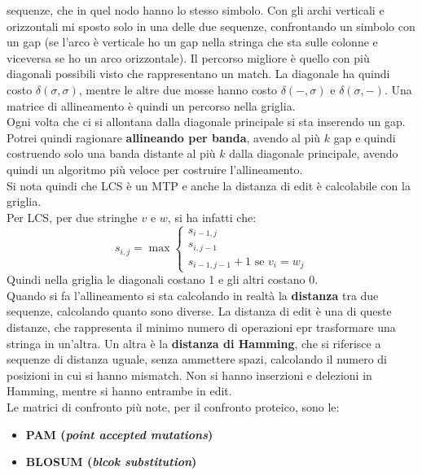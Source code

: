 \documentclass[a4paper,12pt, oneside]{book}
\begin{document}
sequenze, che in quel nodo hanno lo stesso simbolo. Con gli archi verticali e
orizzontali mi sposto solo in una delle due sequenze, confrontando un simbolo
con un gap (se l'arco è verticale ho un gap nella stringa che sta sulle colonne
e viceversa se ho un arco orizzontale). Il percorso migliore è quello con più
diagonali possibili visto che rappresentano un match. La diagonale ha quindi
costo $\delta(\sigma,\sigma)$, mentre le altre due mosse hanno costo
$\delta(-,\sigma)$ e $\delta(\sigma,-)$. Una matrice di
allineamento è quindi un percorso nella griglia.\\
Ogni volta che ci si allontana dalla diagonale principale si sta inserendo un
gap. Potrei quindi ragionare \textbf{allineando per banda}, avendo al più $k$
gap e quindi costruendo solo una banda distante al più $k$ dalla diagonale
principale, avendo quindi un algoritmo più veloce per costruire
l'allineamento. \\
Si nota quindi che LCS è un MTP e anche la distanza di edit è calcolabile con la
griglia. \\
Per LCS, per due stringhe $v$ e $w$, si ha infatti che:
\[s_{i,j}=\max
  \begin{cases}
    s_{i-1,j}\\
    s_{i,j-1}\\
    s_{i-1,j-1}+1\mbox{ se } v_i=w_j
  \end{cases}
\]
Quindi nella griglia le diagonali costano 1 e gli altri costano 0. \\
Quando si fa l'allineamento si sta calcolando in realtà la \textbf{distanza} tra
due sequenze, calcolando quanto sono diverse. La distanza di edit è una di
queste distanze, che rappresenta il minimo numero di operazioni epr trasformare
una stringa in un'altra. Un altra è la \textbf{distanza di Hamming}, che si
riferisce a sequenze di distanza uguale, senza ammettere spazi, calcolando il
numero di posizioni in cui si hanno mismatch. Non si hanno inserzioni e
delezioni in Hamming, mentre si hanno entrambe in edit.\\
Le matrici di confronto più note, per il confronto proteico, sono le:
\begin{itemize}
  \item \textbf{PAM (\textit{point accepted mutations})}
  \item \textbf{BLOSUM (\textit{blcok substitution})}
\end{itemize}
\end{document}
